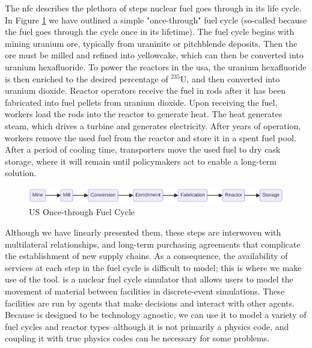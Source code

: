 The \gls{nfc} describes the plethora of steps nuclear fuel goes through
in its life cycle. In Figure \ref{fig:once-through} we have outlined a
simple "once-through" fuel cycle (so-called because the fuel goes through
the cycle once in its lifetime). The fuel cycle begins with mining uranium ore,
typically from uraninite or pitchblende deposits. Then the ore must be milled
and refined into yellowcake, which can then be converted into uranium
hexafluoride. To power the reactors in the \gls{usa}, the uranium hexafluoride
is then enriched to the desired percentage of $^{235}$U, and then converted
into uranium dioxide. Reactor operators receive the fuel in rods after it has
been fabricated into fuel pellets from uranium dioxide. Upon receiving the
fuel, workers load the rods into the reactor to generate heat. The heat
generates steam, which drives a turbine and generates electricity. After years
of operation, workers remove the used fuel from the reactor and store it in a
spent fuel pool. After a period of cooling time, transporters move the used
fuel to dry cask storage, where it will remain until policymakers act to enable
a long-term solution.

\begin{figure}[H]
    \centering
    \includegraphics[scale=0.40]{images/once_through_fc.png}
    \caption{US Once-through Fuel Cycle}
    \label{fig:once-through}
\end{figure}

Although we have linearly presented them, these steps are interwoven with
multilateral relationships, and long-term purchasing agreements that complicate
the establishment of new supply chains. As a consequence, the availability of
services at each step in the fuel cycle is difficult to model; this is where we
make use of the \cyclus \cite{huff_cyclus_intro_2016} tool. \cyclus is a
nuclear fuel cycle simulator that allows users to model the movement of
material between facilities in discrete-event simulations. These facilities
are run by agents that make decisions and interact with other agents. Because
\cyclus is designed to be technology agnostic, we can use it to model a variety
of fuel cycles and reactor types--although it is not primarily a physics code,
and coupling it with true physics codes can be necessary for some problems.

